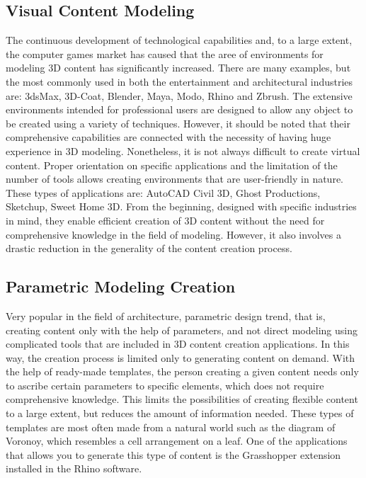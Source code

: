 \documentclass[runningheads]{llncs}
\begin{document}
\subsection{Visual Content Modeling}
The continuous development of technological capabilities and, to a large extent, the computer games market has caused that the aree of environments for modeling 3D content has significantly increased. There are many examples, but the most commonly used in both the entertainment and architectural industries are: 3dsMax, 3D-Coat, Blender, Maya, Modo, Rhino and Zbrush. The extensive environments intended for professional users are designed to allow any object to be created using a variety of techniques. However, it should be noted that their comprehensive capabilities are connected with the necessity of having huge experience in 3D modeling.
Nonetheless, it is not always difficult to create virtual content. Proper orientation on specific applications and the limitation of the number of tools allows creating environments that are user-friendly in nature. These types of applications are: AutoCAD Civil 3D, Ghost Productions, Sketchup, Sweet Home 3D. From the beginning, designed with specific industries in mind, they enable efficient creation of 3D content without the need for comprehensive knowledge in the field of modeling. However, it also involves a drastic reduction in the generality of the content creation process.

\subsection{Parametric Modeling Creation}
Very popular in the field of architecture, parametric design trend, that is, creating content only with the help of parameters, and not direct modeling using complicated tools that are included in 3D content creation applications. In this way, the creation process is limited only to generating content on demand. With the help of ready-made templates, the person creating a given content needs only to ascribe certain parameters to specific elements, which does not require comprehensive knowledge. This limits the possibilities of creating flexible content to a large extent, but reduces the amount of information needed. These types of templates are most often made from a natural world such as the diagram of Voronoy, which resembles a cell arrangement on a leaf. One of the applications that allows you to generate this type of content is the Grasshopper extension installed in the Rhino software.
\end{document}
